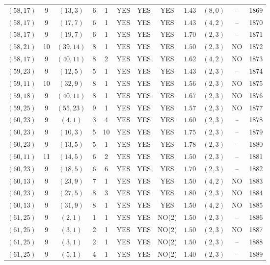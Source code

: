 \begin{longtable}{|c|c|c|c|c|c|c|c|c|c|c|c|}
$(58,17)$ & 9 & $(13,3)$ & 6 & 1 & YES & YES & YES & $1.43$ & $(8,0)$ & -- & 1869\\
$(58,17)$ & 9 & $(17,7)$ & 6 & 1 & YES & YES & YES & $1.43$ & $(4,2)$ & -- & 1870\\
$(58,17)$ & 9 & $(19,7)$ & 6 & 1 & YES & YES & YES & $1.70$ & $(2,3)$ & -- & 1871\\
$(58,21)$ & 10 & $(39,14)$ & 8 & 1 & YES & YES & YES & $1.50$ & $(2,3)$ & NO & 1872\\
$(58,17)$ & 9 & $(40,11)$ & 8 & 2 & YES & YES & YES & $1.62$ & $(4,2)$ & NO & 1873\\
$(59,23)$ & 9 & $(12,5)$ & 5 & 1 & YES & YES & YES & $1.43$ & $(2,3)$ & -- & 1874\\
$(59,11)$ & 10 & $(32,9)$ & 8 & 1 & YES & YES & YES & $1.56$ & $(2,3)$ & NO & 1875\\
$(59,18)$ & 9 & $(40,11)$ & 8 & 1 & YES & YES & YES & $1.67$ & $(2,3)$ & NO & 1876\\
$(59,25)$ & 9 & $(55,23)$ & 9 & 1 & YES & YES & YES & $1.57$ & $(2,3)$ & NO & 1877\\
$(60,23)$ & 9 & $(4,1)$ & 3 & 4 & YES & YES & YES & $1.60$ & $(2,3)$ & -- & 1878\\
$(60,23)$ & 9 & $(10,3)$ & 5 & 10 & YES & YES & YES & $1.75$ & $(2,3)$ & -- & 1879\\
$(60,23)$ & 9 & $(13,5)$ & 5 & 1 & YES & YES & YES & $1.78$ & $(2,3)$ & -- & 1880\\
$(60,11)$ & 11 & $(14,5)$ & 6 & 2 & YES & YES & YES & $1.50$ & $(2,3)$ & -- & 1881\\
$(60,23)$ & 9 & $(18,5)$ & 6 & 6 & YES & YES & YES & $1.70$ & $(2,3)$ & -- & 1882\\
$(60,13)$ & 9 & $(23,9)$ & 7 & 1 & YES & YES & YES & $1.50$ & $(4,2)$ & NO & 1883\\
$(60,23)$ & 9 & $(27,5)$ & 8 & 3 & YES & YES & YES & $1.80$ & $(2,3)$ & NO & 1884\\
$(60,13)$ & 9 & $(31,9)$ & 8 & 1 & YES & YES & YES & $1.50$ & $(4,2)$ & NO & 1885\\
$(61,25)$ & 9 & $(2,1)$ & 1 & 1 & YES & YES & NO(2) & $1.50$ & $(2,3)$ & -- & 1886\\
$(61,25)$ & 9 & $(3,1)$ & 2 & 1 & YES & YES & NO(2) & $1.50$ & $(2,3)$ & NO & 1887\\
$(61,25)$ & 9 & $(3,1)$ & 2 & 1 & YES & YES & NO(2) & $1.50$ & $(2,3)$ & -- & 1888\\
$(61,25)$ & 9 & $(5,1)$ & 4 & 1 & YES & YES & NO(2) & $1.40$ & $(2,3)$ & -- & 1889\\

\end{longtable}
